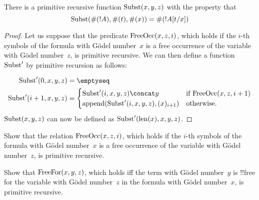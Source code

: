 \documentclass[../../include/open-logic-section]{subfiles}
\begin{document}

\begin{prop}
There is a primitive recursive function $\mathrm{Subst}(x, y, z)$ with the property that
\[
\mathrm{Subst}(\#(!A), \#(t), \#(x)) = \#(!A[t/x])
\]
\end{prop}

\begin{proof}
Let us suppose that the predicate $\mathrm{FreeOcc}(x, z, i)$, which holds
if the $i$-th symbols of the formula with G\"odel number~$x$ is a free
occurrence of the variable with G\"odel number~$z$, is primitive
recursive.  We can then define a function $\mathrm{Subst}'$ by primitive
recursion as follows:

\begin{align*}
\fn{Subst}'(0, x, y, z) & = \emptyseq \\
\fn{Subst}'(i + 1, x, y, z) & =
\begin{cases}
\fn{Subst}'(i, x, y, z) \concat y & \text{if $\fn{FreeOcc}(x, z, i+1)$} \\
\fn{append}(\fn{Subst}'(i, x, y, z), (x)_{i+1}) & \text{otherwise.}
\end{cases}
\end{align*}
$\mathrm{Subst}(x, y, z)$ can now be defined as $\mathrm{Subst}'(\mathrm{len}(x), x, y, z)$.
\end{proof}

\begin{prob}
Show that the relation $\mathrm{FreeOcc}(x, z, i)$, which holds if the
$i$-th symbols of the formula with G\"odel number~$x$ is a free
occurrence of the variable with G\"odel number~$z$, is primitive
recursive.
\end{prob}

\begin{prob}
Show that $\mathrm{FreeFor}(x, y, z)$, which holds iff the term with
G\"odel number~$y$ is !!{free for} the variable with G\"odel
number~$z$ in the formula with G\"odel number~$x$, is primitive
recursive.
\end{prob}
\end{document}
